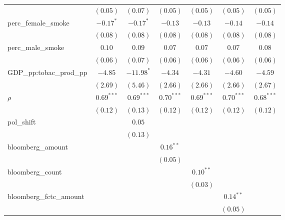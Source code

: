 \begin{table}[!h]
\begin{center}
\begin{tabular}{l c c c c c c }
                        & $(0.05)$     & $(0.07)$     & $(0.05)$     & $(0.05)$     & $(0.05)$     & $(0.05)$     \\
perc\_female\_smoke     & $-0.17^{*}$  & $-0.17^{*}$  & $-0.13$      & $-0.13$      & $-0.14$      & $-0.14$      \\
                        & $(0.08)$     & $(0.08)$     & $(0.08)$     & $(0.08)$     & $(0.08)$     & $(0.08)$     \\
perc\_male\_smoke       & $0.10$       & $0.09$       & $0.07$       & $0.07$       & $0.07$       & $0.08$       \\
                        & $(0.06)$     & $(0.07)$     & $(0.06)$     & $(0.06)$     & $(0.06)$     & $(0.06)$     \\
GDP\_pp:tobac\_prod\_pp & $-4.85$      & $-11.98^{*}$ & $-4.34$      & $-4.31$      & $-4.60$      & $-4.59$      \\
                        & $(2.69)$     & $(5.46)$     & $(2.66)$     & $(2.66)$     & $(2.66)$     & $(2.67)$     \\
$\rho$                  & $0.69^{***}$ & $0.69^{***}$ & $0.70^{***}$ & $0.69^{***}$ & $0.70^{***}$ & $0.68^{***}$ \\
                        & $(0.12)$     & $(0.13)$     & $(0.12)$     & $(0.12)$     & $(0.12)$     & $(0.12)$     \\
pol\_shift              &              & $0.05$       &              &              &              &              \\
                        &              & $(0.13)$     &              &              &              &              \\
bloomberg\_amount       &              &              & $0.16^{**}$  &              &              &              \\
                        &              &              & $(0.05)$     &              &              &              \\
bloomberg\_count        &              &              &              & $0.10^{**}$  &              &              \\
                        &              &              &              & $(0.03)$     &              &              \\
bloomberg\_fctc\_amount &              &              &              &              & $0.14^{**}$  &              \\
                        &              &              &              &              & $(0.05)$     &              \\

\end{tabular}
\end{center}
\end{table}
